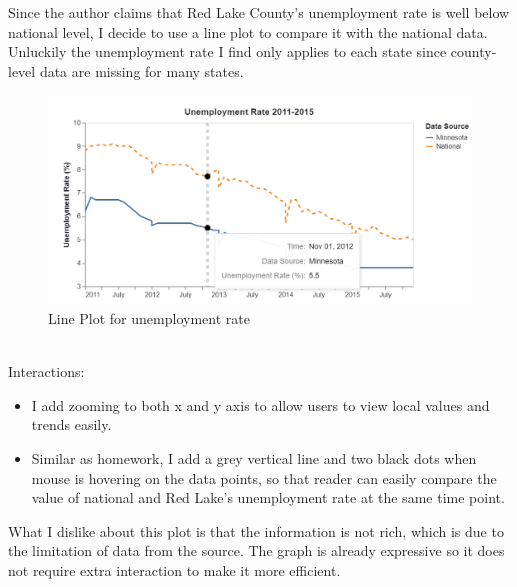 \documentclass{article}
\begin{document}
Since the author claims that Red Lake County's unemployment rate is well below national level, I decide to use a line plot to compare it with the national data. Unluckily the unemployment rate I find only applies to each state since county-level data are missing for many states. \\
\begin{figure}[htbp]
    \centering
    \includegraphics[scale=0.9]{v1.png}
    \caption{Line Plot for unemployment rate}
\end{figure} \\
Interactions: \\
\begin{itemize}
    \item I add zooming to both x and y axis to allow users to view local values and trends easily.
    \item Similar as homework, I add a grey vertical line and two black dots when mouse is hovering on the data points, so that reader can easily compare the value of national and Red Lake's unemployment rate at the same time point.
\end{itemize}
What I dislike about this plot is that the information is not rich, which is due to the limitation of data from the source. The graph is already expressive so it does not require extra interaction to make it more efficient.

\newpage
\end{document}
